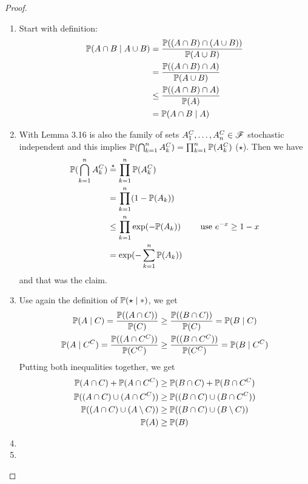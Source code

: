 \begin{proof}\
	\begin{enumerate}
		\item Start with definition:
		\begin{align*}
			\mathbb{P}(A \cap B \mid A \cup B) &= \frac{\mathbb{P}((A\cap B)\cap (A \cup B))}{\mathbb{P}(A \cup B)}\\
			&= \frac{\mathbb{P}((A\cap B)\cap A)}{\mathbb{P}(A \cup B)}\\
			&\le \frac{\mathbb{P}((A\cap B)\cap A)}{\mathbb{P}(A)}\\
			&= \mathbb{P}(A\cap B \mid A)
		\end{align*}
		\item With Lemma 3.16 is also the family of sets $A^C_1 , \dots, A^C_n \in \mathscr{F}$ stochastic independent and this implies $\mathbb{P}(\bigcap_{k=1}^n A_k^C) = \prod_{k=1}^{n} \mathbb{P}(A_k^C)$ ($\star$). Then we have
		\begin{align*}
			\mathbb{P}(\bigcap_{k=1}^n A^C_k) &\overset{\star}{=} \prod_{k=1}^n \mathbb{P}(A_k^C)\\
			&= \prod_{k=1}^n (1-\mathbb{P}(A_k))\\
			&\le \prod_{k=1}^n \exp(-\mathbb{P}(A_k)) \qquad \text{ use $e^{-x} \ge 1 - x$}\\
			&= \exp(-\sum_{k=1}^n \mathbb{P}(A_k))
		\end{align*}
		and that was the claim.
		\item Use again the definition of $\mathbb{P}(\star \mid \ast)$, we get
		\begin{align*}
			\mathbb{P}(A \mid C) = \frac{\mathbb{P}((A\cap C))}{\mathbb{P}(C)} &\ge \frac{\mathbb{P}((B\cap C))}{\mathbb{P}(C)} = \mathbb{P}(B\mid C)\\
			\mathbb{P}(A \mid C^C) = \frac{\mathbb{P}((A\cap C^C))}{\mathbb{P}(C^C)} &\ge \frac{\mathbb{P}((B\cap C^C))}{\mathbb{P}(C^C)} = \mathbb{P}(B\mid C^C)
		\end{align*}
		Putting both inequalities together, we get
		\begin{align*}
			\mathbb{P}(A \cap C) + \mathbb{P}(A \cap C^C) &\ge \mathbb{P}(B \cap C) + \mathbb{P}(B \cap C^C)\\
			\mathbb{P}((A \cap C) \cup (A \cap C^C)) &\ge \mathbb{P}((B \cap C) \cup (B \cap C^C))\\
			\mathbb{P}((A \cap C) \cup (A \setminus C)) &\ge \mathbb{P}((B \cap C) \cup (B \setminus C))\\
			\mathbb{P}(A) &\ge \mathbb{P}(B)
		\end{align*}
		\item %
		\item %
	\end{enumerate}
\end{proof}


